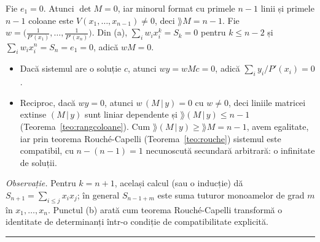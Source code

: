 Fie $e_1=0$. Atunci $\det M=0$, iar minorul format cu primele $n-1$ linii și primele $n-1$ coloane este $V(x_1,\dots,x_{n-1})\neq0$, deci $\rang M=n-1$. Fie $w=\bigl(\frac1{P'(x_1)},\dots,\frac1{P'(x_n)}\bigr)$. Din (a), $\sum_iw_ix_i^k=S_k=0$ pentru $k\le n-2$ și $\sum_iw_ix_i^n=S_n=e_1=0$, adică $wM=0$.
\begin{itemize}[nosep,leftmargin=1.6em]
  \item Dacă sistemul are o soluție $c$, atunci $wy=wMc=0$, adică $\sum_iy_i/P'(x_i)=0$.
  \item Reciproc, dacă $wy=0$, atunci $w\,(M\,|\,y)=0$ cu $w\neq0$, deci liniile matricei extinse $(M\,|\,y)$ sunt liniar dependente și $\rang(M\,|\,y)\le n-1$ (Teorema~\ref{teo:rangcoloane}). Cum $\rang(M\,|\,y)\ge\rang M=n-1$, avem egalitate, iar prin teorema Rouché-Capelli (Teorema~\ref{teo:rouche}) sistemul este compatibil, cu $n-(n-1)=1$ necunoscută secundară arbitrară: o infinitate de soluții.
\end{itemize}
\emph{Observație.} Pentru $k=n+1$, același calcul (sau o inducție) dă $S_{n+1}=\sum_{i\le j}x_ix_j$; în general $S_{n-1+m}$ este suma tuturor monoamelor de grad $m$ în $x_1,\dots,x_n$. Punctul (b) arată cum teorema Rouché-Capelli transformă o identitate de determinanți într-o condiție de compatibilitate explicită.
\vspace{1mm}\hrule

